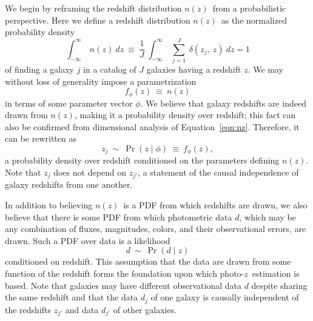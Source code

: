 \documentclass[iop]{emulateapj}
\newcommand{\nz}{$n(z)$}
\newcommand{\pz}{photo-$z$}
\begin{document}
We begin by reframing the redshift distribution \nz\ from a probabilistic perspective.
Here we define a redshift distribution \nz\ as the normalized probability density
\begin{equation}
\label{eqn:nz}
\int_{-\infty}^{\infty}\ n(z)\ dz\ \equiv\ \frac{1}{J}\ \int_{-\infty}^{\infty}\ \sum_{j=1}^{J}\ \delta(z_{j},\ z)\ dz = 1
\end{equation}
of finding a galaxy $j$ in a catalog of $J$ galaxies having a redshift $z$.
We may without loss of generality impose a parametrization
\begin{equation}
\label{eqn:fz}
f_{\phi}(z)\ \equiv\ n(z)
\end{equation}
in terms of some parameter vector $\phi$.
We believe that galaxy redshifts are indeed drawn from \nz, making it a probability density over redshift; this fact can also be confirmed from dimensional analysis of Equation~\ref{eqn:nz}.
Therefore, it can be rewritten as
\begin{equation}
\label{eqn:pz}
z_{j}\ \sim\ \Pr(z \mid \phi)\ \equiv\ f_{\phi}(z),
\end{equation}
a probability density over redshift conditioned on the parameters defining \nz.
Note that $z_{j}$ does not depend on $z_{j'}$, a statement of the causal independence of galaxy redshifts from one another.

In addition to believing \nz\ is a PDF from which redshifts are drawn, we also believe that there is some PDF from which photometric data $d$, which may be any combination of fluxes, magnitudes, colors, and their observational errors, are drawn.
Such a PDF over data is a likelihood
\begin{equation}
\label{eqn:pzpdf}
d\ \sim\ \Pr(d \mid z)
\end{equation}
conditioned on redshift.
This assumption that the data are drawn from some function of the redshift forms the foundation upon which \pz\ estimation is based.
Note that galaxies may have different observational data $d$ despite sharing the same redshift and that the data $d_{j}$ of one galaxy is causally independent of the redshifts $z_{j'}$ and data $d_{j'}$ of other galaxies.
\end{document}

